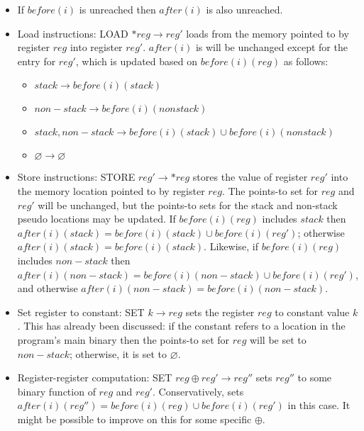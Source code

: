 \begin{itemize}
\item
  If $before(i)$ is unreached then $after(i)$ is also unreached.
\item
  Load instructions: LOAD ${\ast}reg \rightarrow reg'$ loads from the
  memory pointed to by register $reg$ into register $reg'$.
  $after(i)$ is will be unchanged except for the entry for $reg'$,
  which is updated based on $before(i)(reg)$ as follows:

  \begin{itemize}
  \item $stack \rightarrow before(i)(stack)$
  \item $non-stack \rightarrow before(i)(nonstack)$
  \item ${stack,non-stack} \rightarrow before(i)(stack) {\cup} before(i)(nonstack)$
  \item $\varnothing \rightarrow \varnothing$ 
  \end{itemize}

\item
  Store instructions: STORE $reg' \rightarrow {\ast}reg$ stores the
  value of register $reg'$ into the memory location pointed to by
  register $reg$.  The points-to set for $reg$ and $reg'$ will be
  unchanged, but the points-to sets for the stack and non-stack pseudo
  locations may be updated.  If $before(i)(reg)$ includes $stack$ then
  $after(i)(stack) = before(i)(stack) \cup before(i)(reg')$; otherwise
  $after(i)(stack) = before(i)(stack)$.  Likewise, if $before(i)(reg)$
  includes $non-stack$ then $after(i)(non-stack) =
  before(i)(non-stack) \cup before(i)(reg')$, and otherwise
  $after(i)(non-stack) = before(i)(non-stack)$.
\item
  Set register to constant: SET $k \rightarrow reg$ sets the register
  $reg$ to constant value $k$.  This has already been discussed: if
  the constant refers to a location in the program's main binary then
  the points-to set for $reg$ will be set to $non-stack$; otherwise,
  it is set to $\varnothing$.
\item
  Register-register computation: SET $reg \oplus reg' \rightarrow
  reg''$ sets $reg''$ to some binary function of $reg$ and $reg'$.
  Conservatively, {\technique} sets $after(i)(reg'') = before(i)(reg)
  \cup before(i)(reg')$ in this case.  It might be possible to improve
  on this for some specific $\oplus$.


\end{itemize}
